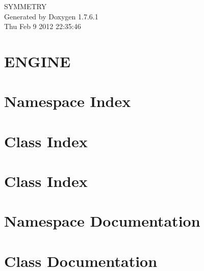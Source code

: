 \documentclass[a4paper]{book}
\begin{document}
\hypersetup{pageanchor=false,citecolor=blue}
\begin{titlepage}
\vspace*{7cm}
\begin{center}
{\Large \-S\-Y\-M\-M\-E\-T\-R\-Y }\\
\vspace*{1cm}
{\large \-Generated by Doxygen 1.7.6.1}\\
\vspace*{0.5cm}
{\small Thu Feb 9 2012 22:35:46}\\
\end{center}
\end{titlepage}
\clearemptydoublepage
{}
\tableofcontents
\clearemptydoublepage
{}
\hypersetup{pageanchor=true,citecolor=blue}
\chapter{\-E\-N\-G\-I\-N\-E}
\label{index}\hypertarget{index}{}
\chapter{\-Namespace \-Index}

\chapter{\-Class \-Index}

\chapter{\-Class \-Index}

\chapter{\-Namespace \-Documentation}

\chapter{\-Class \-Documentation}



















\printindex
\end{document}

